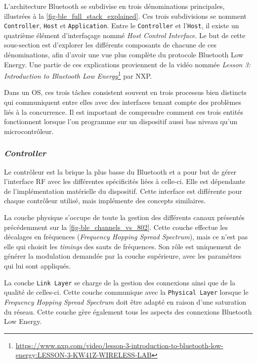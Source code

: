 L'architecture Bluetooth se subdivise en trois dénominations principales, illustrées à la \cref{fig-ble_full_stack_explained}. Ces trois subdivisions se nomment \texttt{Controller}, \texttt{Host} et \texttt{Application}. Entre le \texttt{Controller} et l'\texttt{Host}, il existe un quatrième élément d'interfaçage nommé \textit{Host Control Interface}. Le but de cette sous-section est d'explorer les différents composants de chacune de ces dénominations, afin d'avoir une vue plus complète du protocole Bluetooth Low Energy. Une partie de ces explications proviennent de la vidéo nommée \textit{Lesson 3: Introduction to Bluetooth Low Energy}\footnote{\url{https://www.nxp.com/video/lesson-3-introduction-to-bluetooth-low-energy:LESSON-3-KW41Z-WIRELESS-LAB}} par NXP. 

Dans un OS, ces trois tâches consistent souvent en trois processus bien distincts qui communiquent entre elles avec des interfaces tenant compte des problèmes liés à la concurrence. Il est important de comprendre comment ces trois entités fonctionnent lorsque l'on programme sur un dispositif aussi bas niveau qu'un microcontrôleur. 


\subsubsection{\textit{Controller}}

Le contrôleur est la brique la plus basse du Bluetooth et a pour but de gérer l'interface RF avec les différentes spécificités liées à celle-ci. Elle est dépendante de l'implémentation matérielle du dispositif. Cette interface est différente pour chaque contrôleur utilisé, mais implémente des concepts similaires.


La couche physique s'occupe de toute la gestion des différents canaux présentés précédemment sur la \cref{fig-ble_channels_vs_802}. Cette couche effectue les décalages en fréquences (\textit{Frequency Hopping Spread Spectrum}), mais ce n'est pas elle qui choisit les \textit{timings} des sauts de fréquences. Son rôle est uniquement de générer la modulation demandée par la couche supérieure, avec les paramètres qui lui sont appliqués.


La couche \texttt{Link Layer} se charge de la gestion des connexions ainsi que de la qualité de celles-ci. Cette couche communique avec la \texttt{Physical Layer} lorsque le \textit{Frequency Hopping Spread Spectrum} doit être adapté en raison d'une saturation du réseau. Cette couche gère également tous les aspects des connexions Bluetooth Low Energy.


